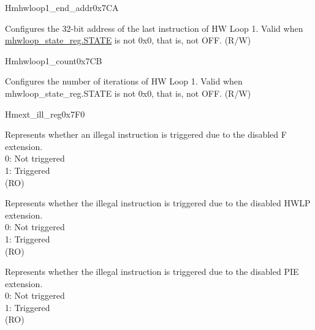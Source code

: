 \begin{register}{H}{mhwloop1\_end\_addr}{0x7CA}\label{regdesc:mhloop1_end_addr}
%
\regnewline%
\begin{regdesc}\begin{reglist}
\label{fielddesc:HWLP1_EA}\item [EA] Configures the 32-bit address of the last instruction of HW Loop 1. Valid when \hyperref[fielddesc:HWSTATE]{mhwloop\_state\_reg.STATE} is not 0x0, that is, not OFF. (R/W)
\end{reglist}\end{regdesc}
\end{register}

\begin{register}{H}{mhwloop1\_count}{0x7CB}\label{regdesc:mhloop1_count}
%
%
\regnewline%
\begin{regdesc}\begin{reglist}
\label{fielddesc:MHLP1_COUNT}\item [COUNT] Configures the number of iterations of HW Loop 1. Valid when mhwloop\_state\_reg.STATE is not 0x0, that is, not OFF. (R/W)
\end{reglist}\end{regdesc}
\end{register}

\begin{register}{H}{mext\_ill\_reg}{0x7F0}\label{regdesc:mext_ill_reg}
%
%
%
%
\regnewline%
\begin{regdesc}\begin{reglist}
\label{fielddesc:ILL_FPU}\item [ILL\_FPU] Represents whether an illegal instruction is triggered due to the disabled F extension.\\
0: Not triggered\\
1: Triggered\\
(RO)
\label{fielddesc:ILL_HWL}\item [ILL\_HWL] Represents whether the illegal instruction is triggered due to the disabled HWLP extension. \\
0: Not triggered\\
1: Triggered\\
(RO)
\label{fielddesc:ILL_PIE}\item [ILL\_PIE] Represents whether the illegal instruction is triggered due to the disabled PIE extension. \\
0: Not triggered\\
1: Triggered\\
(RO)
\end{reglist}\end{regdesc}
\end{register}


